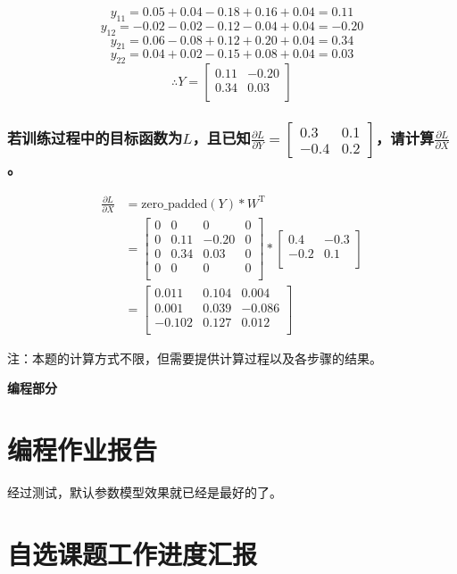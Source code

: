 \documentclass[a4paper]{article}
\begin{document}
\[y_{11} = 0.05 + 0.04 - 0.18 + 0.16 + 0.04 = 0.11\]
\[y_{12} = -0.02 - 0.02 - 0.12 - 0.04 + 0.04 = -0.20\]
\[y_{21} = 0.06 - 0.08 + 0.12 + 0.20 + 0.04 = 0.34\]
\[y_{22} = 0.04 + 0.02 - 0.15 + 0.08 + 0.04 = 0.03\]
\[\therefore Y = \begin{bmatrix}
                0.11 & -0.20 \\
                0.34 & 0.03 \\
                \end{bmatrix}\]

\subsubsection{若训练过程中的目标函数为$L$，且已知$\frac{\partial L}{\partial Y}=\left[ \begin{array}{cc}
    0.3 & 0.1 \\
    -0.4 & 0.2
\end{array} \right]$，请计算$\frac{\partial L}{\partial X}$。
}
\begin{align*}
    \frac{\partial L}{\partial X} &= \mathrm{zero\_padded}(Y) * W^{\mathrm{T}} \\
    &= \begin{bmatrix}
        0 & 0 & 0 & 0 \\
        0 & 0.11 & -0.20 & 0 \\
        0 & 0.34 & 0.03 & 0 \\
        0 & 0 & 0 & 0 \\
    \end{bmatrix} *
    \begin{bmatrix}
        0.4 & -0.3 \\
        -0.2 & 0.1 \\
    \end{bmatrix} \\
    &= \begin{bmatrix}
        0.011 & 0.104 & 0.004 \\
        0.001 & 0.039 & -0.086 \\
        -0.102 & 0.127 &0.012 \\
    \end{bmatrix}
\end{align*}

注：本题的计算方式不限，但需要提供计算过程以及各步骤的结果。
\vspace{6mm}

\centerline{\textbf{\Large{编程部分}}}
\vspace{3mm}

\section{编程作业报告}


经过测试，默认参数模型效果就已经是最好的了。


\section{自选课题工作进度汇报}
\end{document}
